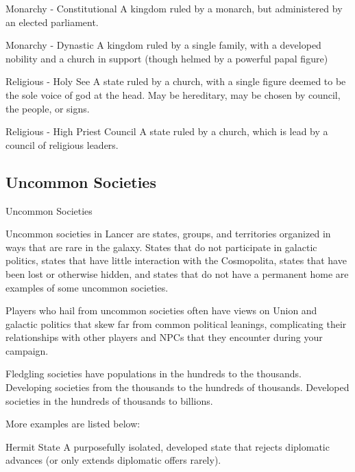  Monarchy - Constitutional                             A kingdom ruled by a monarch, but
                                                       administered by an elected parliament.

 Monarchy - Dynastic                                   A kingdom ruled by a single family, with a
                                                       developed nobility and a church in support
                                                       (though helmed by a powerful papal figure)

 Religious - Holy See                                  A state ruled by a church, with a single figure
                                                       deemed to be the sole voice of god at the
                                                       head. May be hereditary, may be chosen by
                                                       council, the people, or signs.

 Religious - High Priest Council                       A state ruled by a church, which is lead by a
                                                       council of religious leaders.

\subsection{Uncommon Societies}
Uncommon Societies

Uncommon societies in Lancer are states, groups, and territories organized in ways that are rare
in the galaxy. States that do not participate in galactic politics, states that have little interaction
with the Cosmopolita, states that have been lost or otherwise hidden, and states that do not
have a permanent home are examples of some uncommon societies.


Players who hail from uncommon societies often have views on Union and galactic politics that
skew far from common political leanings, complicating their relationships with other players and
NPCs that they encounter during your campaign.


Fledgling societies have populations in the hundreds to the thousands. Developing societies
from the thousands to the hundreds of thousands. Developed societies in the hundreds of
thousands to billions.





More examples are listed below:


             Hermit State                         A purposefully isolated, developed state that rejects
                                                  diplomatic advances (or only extends diplomatic
                                                  offers rarely).

